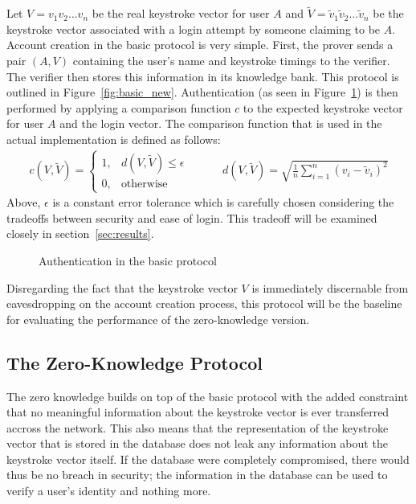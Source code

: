 \documentclass[11pt]{article}
\begin{document}
Let $V=v_1v_2\ldots v_n$ be the real keystroke vector for user $A$ and $\tilde V = \tilde v_1\tilde v_2\ldots\tilde v_n$ be the keystroke vector associated with a login attempt by someone claiming to be $A$. Account creation in the basic protocol is very simple. First, the prover sends a pair $(A,V)$ containing the user's name and keystroke timings to the verifier. The verifier then stores this information in its knowledge bank. This protocol is outlined in Figure~\ref{fig:basic_new}. Authentication (as seen in Figure~\ref{fig:basic_auth}) is then performed by applying a comparison function $c$ to the expected keystroke vector for user $A$ and the login vector. The comparison function that is used in the actual implementation is defined as follows:
$$\begin{array}{ccc}
c(V,\tilde V) = \begin{cases}
  1, & d(V, \tilde V) \le \epsilon \\
  0, & \text{otherwise}
\end{cases}
& \;\;\;\;\; &
d(V,\tilde V) = \sqrt{\frac1n\sum_{i=1}^n(v_i - \tilde v_i)^2}
\end{array}$$
Above, $\epsilon$ is a constant error tolerance which is carefully chosen considering the tradeoffs between security and ease of login. This tradeoff will be examined closely in section~\ref{sec:results}.

\begin{figure}[h!]
\centering
{}
\caption{Authentication in the basic protocol}
\label{fig:basic_auth}
\end{figure}


Disregarding the fact that the keystroke vector $V$ is immediately discernable from eavesdropping on the account creation process, this protocol will be the baseline for evaluating the performance of the zero-knowledge version.

\subsection{The Zero-Knowledge Protocol}
The zero knowledge builds on top of the basic protocol with the added constraint that no meaningful information about the keystroke vector is ever transferred accross the network. This also means that the representation of the keystroke vector that is stored in the database does not leak any information about the keystroke vector itself. If the database were completely compromised, there would thus be no breach in security; the information in the database can be used to verify a user's identity and nothing more.
\end{document}
